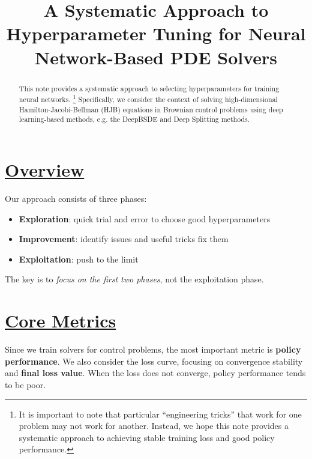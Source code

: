 \documentclass{tufte-handout}
\title{A Systematic Approach to Hyperparameter Tuning for Neural Network-Based PDE Solvers}
\author[]{}
\begin{document}
\setlength\parindent{0pt}

\maketitle

\begin{abstract}
This note provides a systematic approach to selecting hyperparameters for training neural networks.
\footnote{It is important to note that particular ``engineering tricks'' that work for one problem may not work for another. Instead, we hope this note provides a systematic approach to achieving stable training loss and good policy performance.}
Specifically, we consider the context of solving high-dimensional Hamilton-Jacobi-Bellman (HJB) equations in Brownian control problems using deep learning-based methods, e.g. the DeepBSDE and Deep Splitting methods. 
\end{abstract}



\section{\underline{Overview}}\label{sec:overview}

Our approach consists of three phases: 
\begin{itemize}
    \item \textbf{Exploration}: quick trial and error to choose good hyperparameters
    \item \textbf{Improvement}: identify issues and useful tricks fix them
    \item \textbf{Exploitation}: push to the limit
\end{itemize}
The key is to \emph{focus on the first two phases}, not the exploitation phase.



\section{\underline{Core Metrics}}\label{sec:core-metrics}

Since we train solvers for control problems, the most important metric is \textbf{policy performance}.
We also consider the loss curve, focusing on convergence stability and \textbf{final loss value}.
When the loss does not converge, policy performance tends to be poor.
\end{document}
